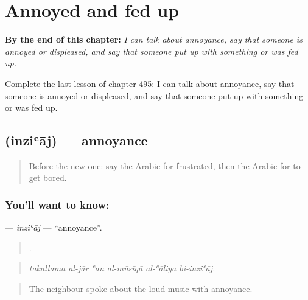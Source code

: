 
\chapter{Annoyed and fed up}
\label{ch:ar-annoyed-and-fed-up}

\begin{chapteropening}
\textbf{By the end of this chapter:} \emph{I can talk about annoyance, say that someone is annoyed or displeased, and say that someone put up with something or was fed up.}

Complete the last lesson of chapter 495: I can talk about annoyance, say that someone is annoyed or displeased, and say that someone put up with something or was fed up.
\end{chapteropening}

\section[\texorpdfstring{\ar{انزعاج} (inziʿāj)}{انزعاج (inziʿāj)}]{ (inziʿāj) — annoyance}

\label{lesson:AR-C495-inziaj}



\begin{quote}
Before the new one: say the Arabic for frustrated, then the Arabic for to get bored.
\end{quote}

\subsection*{You'll want to know: }
\textbf{} — \emph{inziʿāj} — \textquotedblleft{}annoyance\textquotedblright{}.

\begin{quote}
     .
\end{quote}

\begin{quote}
\emph{takallama al-jār ʿan al-mūsīqā al-ʿāliya bi-inziʿāj.}
\end{quote}

\begin{quote}
The neighbour spoke about the loud music with annoyance.
\end{quote}

